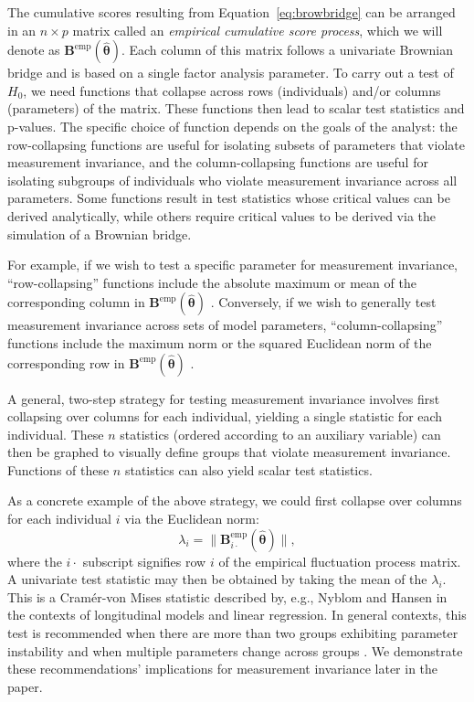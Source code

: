 \documentclass[man]{apa}
\begin{document}
The cumulative scores resulting from Equation~\eqref{eq:browbridge}
can be arranged in an $n \times p$ matrix called an {\em{empirical
    cumulative score process}}, which we will denote as
${\bm{B}}^{\text{emp}}(\widehat{\bm{\theta}})$.
Each column of this matrix follows a univariate Brownian bridge and is
based on a single factor analysis parameter. 
To carry out a test of $H_0$, we need functions that collapse across
rows (individuals) and/or columns (parameters) of the matrix.  These
functions then lead to scalar test statistics and p-values.
The specific choice of function depends on the goals of the analyst:
the row-collapsing functions are useful for isolating subsets of
parameters that violate measurement invariance, and the
column-collapsing functions are useful for isolating subgroups of
individuals who violate measurement invariance across all parameters.
Some functions result in test
statistics whose critical values can be derived analytically, while
others require critical values to be derived via the
simulation of a Brownian bridge.

For example, if we wish to test a specific parameter for
measurement invariance, ``row-collapsing''
functions include the absolute maximum or mean of the corresponding 
column in ${\bm{B}}^{\text{emp}}(\widehat{\bm{\theta}})$
\cite{ZeiHor07}. %
Conversely, if we wish to generally test 
measurement invariance across sets of model parameters,
``column-collapsing'' functions 
include the maximum norm or the squared Euclidean norm of the
corresponding row in ${\bm{B}}^{\text{emp}}(\widehat{\bm{\theta}})$
\cite{HjoKon02}.

A general, two-step strategy for testing measurement
invariance involves first collapsing over columns for each individual,
yielding a single statistic for each individual. 
These $n$ statistics (ordered according to an auxiliary variable)
can then be graphed to visually define groups that violate measurement
invariance.  Functions of these $n$ statistics can also yield scalar
test statistics.

As a concrete example of the above strategy, we could
first collapse over columns for each individual $i$ via the Euclidean
norm:
\begin{equation}
    \label{eq:meanl2}
    \lambda_i = \lVert {\bm B}^{\text{emp}}_{i\cdot}(\widehat{\bm \theta}) \rVert,
\end{equation}
where the $i\cdot$ subscript signifies row $i$ of the empirical
fluctuation process matrix.  A univariate test statistic may then be
obtained by taking the mean of the $\lambda_i$.  This is a
Cram\'{e}r-von Mises statistic described by, e.g., Nyblom
\citeyear{Nyb89} and Hansen \citeyear{Han92} in the contexts of
longitudinal models and linear regression.  In general contexts,
this test is recommended
when there are more than two groups exhibiting parameter instability 
and when multiple parameters change across groups \cite{ZeiSha10}.  
We demonstrate these recommendations' implications for
measurement invariance later in the paper.
\end{document}
